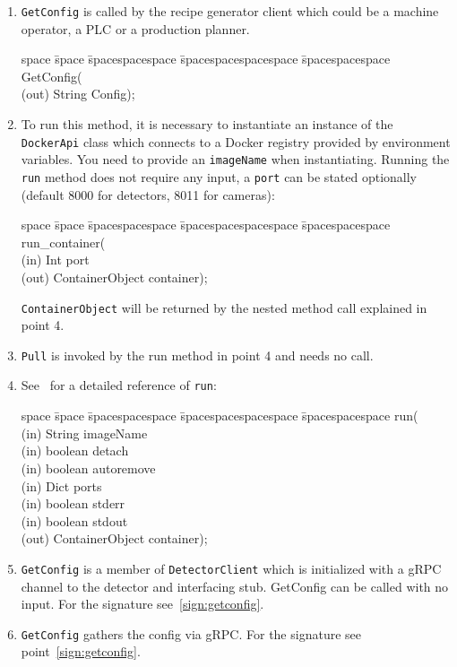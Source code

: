 \begin{enumerate}
    \item \texttt{GetConfig} is called by the recipe generator client which could be a machine operator, a PLC or a production planner. \begin{tabbing}
            space \= space \= spacespacespace \= spacespacespacespace \= spacespacespace \kill
            \>  GetConfig(\\
            \>  \>  (out)	 \> 	String           \> Config); 
        \end{tabbing} \label{sign:getconfig}
        
    \item To run this method, it is necessary to instantiate an instance of the \texttt{DockerApi} class which connects to a Docker registry provided by environment variables. You need to provide an \texttt{imageName} when instantiating. Running the \texttt{run} method does not require any input, a \texttt{port} can be stated optionally (default 8000 for detectors, 8011 for cameras): \begin{tabbing}
    space \= space \= spacespacespace \= spacespacespacespace \= spacespacespace \kill
    \>  run\_container(\\
    \>  \>  (in)	 \> 	Int          \> port\\
    \>  \>  (out)	 \> 	ContainerObject           \> container); 
    \end{tabbing}
    \texttt{ContainerObject} will be returned by the nested method call explained in point 4. \label{sign:runcontainer}
    \item \texttt{Pull} is invoked by the run method in point 4 and needs no call. \label{sign:pull}
    \item See~\cite{N.A.Docker2019} for a detailed reference of \texttt{run}: 
    \begin{tabbing}
    space \= space \= spacespacespace \= spacespacespacespace \= spacespacespace \kill
    \>  run(\\
    \>  \>  (in)	 \> 	String          \> imageName\\
    \>  \>  (in)	 \> 	boolean          \> detach\\
    \>  \>  (in)	 \> 	boolean    \> autoremove\\
    \>  \>  (in)	 \> 	Dict   \> ports\\
    \>  \>  (in)	 \> 	boolean   \> stderr\\
    \>  \>  (in)	 \> 	boolean          \> stdout\\
    \>  \>  (out)	 \> 	ContainerObject           \> container); 
    \end{tabbing}\label{sign:run}
    \item \texttt{GetConfig} is a member of \texttt{DetectorClient} which is initialized with a gRPC channel to the detector and interfacing stub. GetConfig can be called with no input. For the signature see~\ref{sign:getconfig}.
    \item \texttt{GetConfig} gathers the config via gRPC. For the signature see point~\ref{sign:getconfig}.
\end{enumerate}


